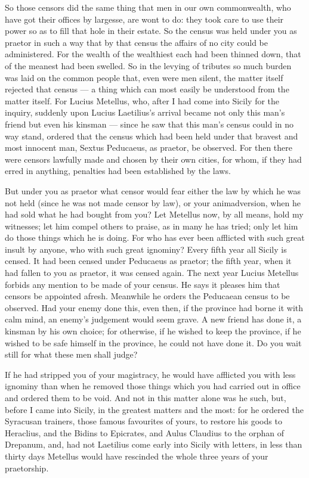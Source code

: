  So those censors did the same thing that men in our own commonwealth, who have got their offices by largesse, are wont to do: they took care to use their power so as to fill that hole in their estate. So the census was held under you as praetor in such a way that by that census the affairs of no city could be administered. For the wealth of the wealthiest each had been thinned down, that of the meanest had been swelled. So in the levying of tributes so much burden was laid on the common people that, even were men silent, the matter itself rejected that census --- a thing which can most easily be understood from the matter itself. For Lucius Metellus, who, after I had come into Sicily for the inquiry, suddenly upon Lucius Laetilius's arrival became not only this man's friend but even his kinsman --- since he saw that this man's census could in no way stand, ordered that the census which had been held under that bravest and most innocent man, Sextus Peducaeus, as praetor, be observed. For then there were censors lawfully made and chosen by their own cities, for whom, if they had erred in anything, penalties had been established by the laws.

 But under you as praetor what censor would fear either the law by which he was not held (since he was not made censor by law), or your animadversion, when he had sold what he had bought from you? Let Metellus now, by all means, hold my witnesses; let him compel others to praise, as in many he has tried; only let him do those things which he is doing. For who has ever been afflicted with such great insult by anyone, who with such great ignominy? Every fifth year all Sicily is censed. It had been censed under Peducaeus as praetor; the fifth year, when it had fallen to you as praetor, it was censed again. The next year Lucius Metellus forbids any mention to be made of your census. He says it pleases him that censors be appointed afresh. Meanwhile he orders the Peducaean census to be observed. Had your enemy done this, even then, if the province had borne it with calm mind, an enemy's judgement would seem grave. A new friend has done it, a kinsman by his own choice; for otherwise, if he wished to keep the province, if he wished to be safe himself in the province, he could not have done it. Do you wait still for what these men shall judge?

 If he had stripped you of your magistracy, he would have afflicted you with less ignominy than when he removed those things which you had carried out in office and ordered them to be void. And not in this matter alone was he such, but, before I came into Sicily, in the greatest matters and the most: for he ordered the Syracusan trainers, those famous favourites of yours, to restore his goods to Heraclius, and the Bidins to Epicrates, and Aulus Claudius to the orphan of Drepanum, and, had not Laetilius come early into Sicily with letters, in less than thirty days Metellus would have rescinded the whole three years of your praetorship.

